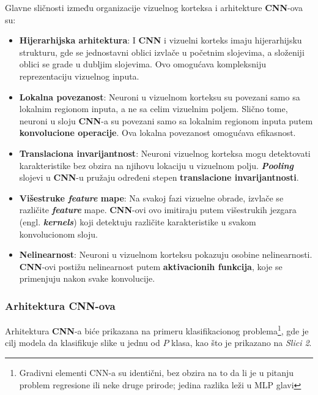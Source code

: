 \documentclass[12pt]{article}
\begin{document}
   Glavne sličnosti \cite{human_visual_cortex} između organizacije vizuelnog korteksa i arhitekture \textbf{CNN}-ova su:
   \begin{itemize}
   \item \textbf{Hijerarhijska arhitektura}: I \textbf{CNN} i vizuelni korteks imaju hijerarhijsku strukturu, 
   gde se jednostavni oblici izvlače u početnim slojevima, a složeniji oblici se grade u dubljim slojevima. 
   Ovo omogućava kompleksniju reprezentaciju vizuelnog inputa.
   \item \textbf{Lokalna povezanost}: Neuroni u vizuelnom korteksu su povezani samo sa 
   lokalnim regionom inputa, a ne sa celim vizuelnim poljem. Slično tome, neuroni 
   u sloju \textbf{CNN}-a su povezani samo sa lokalnim regionom inputa putem \textbf{konvolucione operacije}. 
   Ova lokalna povezanost omogućava efikasnost.
   \item \textbf{Translaciona invarijantnost}: Neuroni vizuelnog korteksa mogu detektovati karakteristike
    bez obzira na njihovu lokaciju u vizuelnom polju. \textbf{\textit{Pooling}} slojevi u \textbf{CNN}-u pružaju određeni 
    stepen \textbf{translacione invarijantnosti}.
    \item \textbf{Višestruke \textit{feature} mape}: Na svakoj fazi vizuelne obrade, izvlače se različite \textbf{\textit{feature}} mape.
    \textbf{CNN}-ovi ovo imitiraju putem višestrukih jezgara (engl. \textbf{\textit{kernels}}) koji detektuju različite karakteristike
      u svakom konvolucionom sloju.
   \item \textbf{Nelinearnost}: Neuroni u vizuelnom korteksu pokazuju osobine nelinearnosti. 
   \textbf{CNN}-ovi postižu nelinearnost putem \textbf{aktivacionih funkcija}, koje se primenjuju nakon svake konvolucije.
   
   \end{itemize}
   
   \newpage

   \subsubsection{Arhitektura \textbf{CNN}-ova}
   Arhitektura \textbf{CNN}-a biće prikazana na primeru klasifikacionog
    problema\footnote{Gradivni elementi CNN-a su identični, bez obzira na to
     da li je u pitanju problem regresione ili neke druge prirode; jedina razlika leži u MLP glavi}, 
     gde je cilj modela da klasifikuje slike u jednu od $P$ klasa, kao što je prikazano na \textit{Slici 2}.
\end{document}
